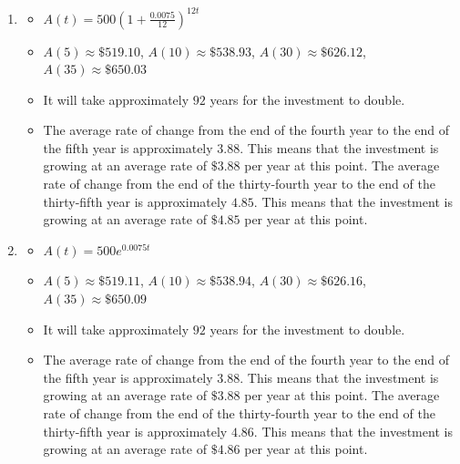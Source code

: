 \documentclass{ximera}
\begin{document}
	\author{Stitz-Zeager}



\begin{enumerate}

\item \begin{itemize}  \item $A(t) = 500\left(1 + \frac{0.0075}{12}\right)^{12t}$ 

\item $A(5) \approx \$ 519.10$, $A(10) \approx \$ 538.93$, $A(30) \approx \$ 626.12$, $A(35) \approx \$ 650.03$ 

\item It will take approximately $92$ years for the investment to double.

\item  The average rate of change from the end of the fourth year to the end of the fifth year is approximately $3.88$.  This means that the investment is growing at an average rate of $\$3.88$ per year at this point.  The average rate of change from the end of the thirty-fourth year to the end of the thirty-fifth year is approximately $4.85$.  This means that the investment is growing at an average rate of $\$4.85$ per year at this point. 

\end{itemize}

\item \begin{itemize}  \item $A(t) = 500e^{0.0075t}$ 

\item $A(5) \approx \$ 519.11$, $A(10) \approx \$ 538.94$, $A(30) \approx \$ 626.16$, $A(35) \approx \$ 650.09$ 

\item It will take approximately $92$ years for the investment to double.

\item  The average rate of change from the end of the fourth year to the end of the fifth year is approximately $3.88$.  This means that the investment is growing at an average rate of $\$3.88$ per year at this point.  The average rate of change from the end of the thirty-fourth year to the end of the thirty-fifth year is approximately $4.86$.  This means that the investment is growing at an average rate of $\$4.86$ per year at this point. 


\end{itemize}
\end{enumerate}
\end{document}
